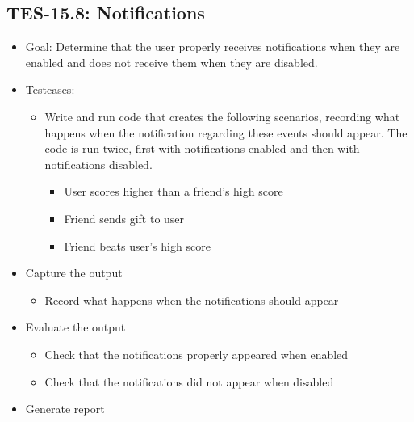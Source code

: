 \subsection{TES-15.8: Notifications}
\label{subsec:notifications}
\begin{itemize}
\item Goal: Determine that the user properly receives notifications when 
they are enabled and does not receive them when they are disabled.
\item Testcases: 
\begin{itemize}
\item Write and run code that creates the following scenarios, recording 
what happens when the notification regarding these events should appear. 
The code is run twice, first with notifications enabled and then with 
notifications disabled.
\begin{itemize}
\item User scores higher than a friend\textquoteright{}s high score
\item Friend sends gift to user
\item Friend beats user\textquoteright{}s high score
\end{itemize}
\end{itemize}
\item Capture the output 
\begin{itemize}
\item Record what happens when the notifications should appear
\end{itemize}
\item Evaluate the output 
\begin{itemize}
\item Check that the notifications properly appeared when enabled
\item Check that the notifications did not appear when disabled
\end{itemize}
\item Generate report 
\end{itemize}

